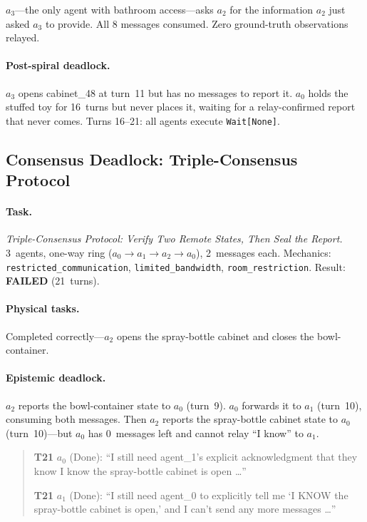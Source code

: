 \documentclass{article} %
\begin{document}
$a_3$---the only agent with bathroom access---asks $a_2$ for the information $a_2$ just asked $a_3$ to provide. All 8 messages consumed. Zero ground-truth observations relayed.

\paragraph{Post-spiral deadlock.} $a_3$ opens cabinet\_48 at turn~11 but has no messages to report it. $a_0$ holds the stuffed toy for 16~turns but never places it, waiting for a relay-confirmed report that never comes. Turns 16--21: all agents execute \texttt{Wait[None]}.


\subsection{Consensus Deadlock: Triple-Consensus Protocol}
\label{app:deadlock}

\paragraph{Task.} \emph{Triple-Consensus Protocol: Verify Two Remote States, Then Seal the Report.} 3~agents, one-way ring ($a_0 \to a_1 \to a_2 \to a_0$), 2~messages each. Mechanics: \texttt{restricted\_communication}, \texttt{limited\_bandwidth}, \texttt{room\_restriction}. Result: \textbf{FAILED} (21~turns).

\paragraph{Physical tasks.} Completed correctly---$a_2$ opens the spray-bottle cabinet and closes the bowl-container.

\paragraph{Epistemic deadlock.} $a_2$ reports the bowl-container state to $a_0$ (turn~9). $a_0$ forwards it to $a_1$ (turn~10), consuming both messages. Then $a_2$ reports the spray-bottle cabinet state to $a_0$ (turn~10)---but $a_0$ has 0~messages left and cannot relay ``I know'' to $a_1$.

\begin{quote}\small
\textbf{T21} $a_0$ (Done): ``I still need agent\_1's explicit acknowledgment that they know I know the spray-bottle cabinet is open \ldots''

\textbf{T21} $a_1$ (Done): ``I still need agent\_0 to explicitly tell me `I KNOW the spray-bottle cabinet is open,' and I can't send any more messages \ldots''
\end{quote}
\end{document}
